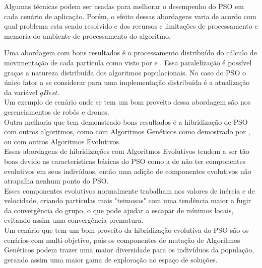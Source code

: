             Algumas técnicas podem ser usadas para melhorar o desempenho do PSO em cada cenário de aplicação. Porém, o efeito dessas abordagens varia de acordo com qual problema esta sendo resolvido e dos recursos e limitações de processamento e memoria do ambiente de processamento do algoritmo.

            Uma abordagem com bons resultados é o processamento distribuído do cálculo de movimentação de cada partícula como visto por \cite{Thongkrairat2019} e \cite{Kim2011}. Essa paralelização é possível graças a natureza distribuída dos algoritmos populacionais. No caso do PSO o único fator a se considerar para uma implementação distribuída é a atualização da variável $gBest$.\\
            Um exemplo de cenário onde se tem um bom proveito dessa abordagem são nos gerenciamentos de robôs e drones.\\  

            Outra melhoria que tem demonstrado bons resultados é a hibridização de PSO com outros algoritmos, como com Algoritmos Genéticos como demostrado por \cite{carvalho2014}, ou com outros Algoritmos Evolutivos.\\
            Essas abordagens de hibridizações com Algoritmos Evolutivos tendem a ser tão boas devido as características básicas do PSO como a de não ter componentes evolutivos em seus indivíduos, então uma adição de componentes evolutivos não atrapalha nenhum ponto do PSO.\\
            Esses componentes evolutivos normalmente trabalham nos valores de inércia e de velocidade, criando partículas mais "teimosas" com uma tendência maior a fugir da convergência do grupo, o que pode ajudar a escapar de mínimos locais, evitando assim uma convergência prematura.\\
            \indent Um cenário que tem um bom proveito da hibridização evolutiva do PSO são os cenários com multi-objetivo, pois os componentes de mutação de Algoritmos Genéticos podem trazer uma maior diversidade para os indivíduos da população, gerando assim uma maior gama de exploração no espaço de soluções.\\

